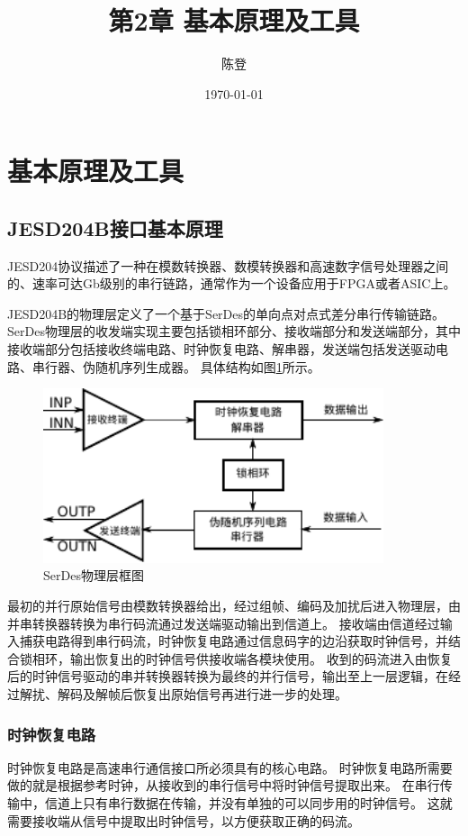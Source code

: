 \documentclass[UTF8]{ctexart}
\title{第2章 基本原理及工具}
\author{陈登}
\date{\today}
\begin{document}
\section{基本原理及工具}

\subsection{JESD204B接口基本原理}

JESD204协议描述了一种在模数转换器、数模转换器和高速数字信号处理器之间的、速率可达Gb级别的串行链路，通常作为一个设备应用于FPGA或者ASIC上。

JESD204B的物理层定义了一个基于SerDes的单向点对点式差分串行传输链路。
SerDes物理层的收发端实现主要包括锁相环部分、接收端部分和发送端部分，其中接收端部分包括接收终端电路、时钟恢复电路、解串器，发送端包括发送驱动电路、串行器、伪随机序列生成器\cite{nishi2008asic}。
具体结构如图\ref{fig:serdes_phylayer_summery}所示。

\begin{figure}[H]
\centering
\includegraphics[width=10cm]{./img/serdes_phylayer_summery.pdf}
\caption{SerDes物理层框图}
\label{fig:serdes_phylayer_summery}
\end{figure}

最初的并行原始信号由模数转换器给出，经过组帧、编码及加扰后进入物理层，由并串转换器转换为串行码流通过发送端驱动输出到信道上。
接收端由信道经过输入捕获电路得到串行码流，时钟恢复电路通过信息码字的边沿获取时钟信号，并结合锁相环，输出恢复出的时钟信号供接收端各模块使用。
收到的码流进入由恢复后的时钟信号驱动的串并转换器转换为最终的并行信号，输出至上一层逻辑，在经过解扰、解码及解帧后恢复出原始信号再进行进一步的处理。

\subsubsection{时钟恢复电路}

时钟恢复电路是高速串行通信接口所必须具有的核心电路。
时钟恢复电路所需要做的就是根据参考时钟，从接收到的串行信号中将时钟信号提取出来。
在串行传输中，信道上只有串行数据在传输，并没有单独的可以同步用的时钟信号。
这就需要接收端从信号中提取出时钟信号，以方便获取正确的码流。
\end{document}

